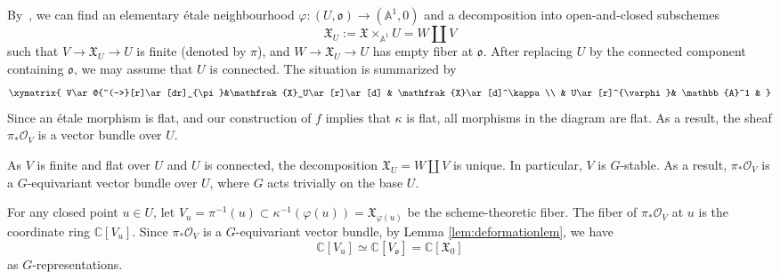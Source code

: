 \documentclass[12pt]{amsart}
\theoremstyle{remark}
\begin{document}
By~\cite[{\href{https://stacks.math.columbia.edu/tag/02LP}{Lemma 37.41.6}}]{Stacks}, we can find an elementary \'etale neighbourhood $\varphi:(U,\mathfrak{o})\to (\mathbb{A}^1,0)$ and a decomposition into open-and-closed subschemes
$$\mathfrak{X}_U:= \mathfrak{X}\times_{\mathbb{A}^1}U 
=W \amalg V$$
such that 
$V\to \mathfrak{X}_U\to U$ is 
finite (denoted by $\pi$), and 
 $W\to \mathfrak{X}_U\to U$ has empty fiber at $\mathfrak{o}$. 
After replacing $U$ by the connected component containing $\mathfrak o$, we may
assume that $U$ is connected. 
The situation is summarized by 
$$\xymatrix{
V\ar@{^(->}[r]\ar[dr]_{\pi}&\mathfrak{X}_U\ar[r]\ar[d] & \mathfrak{X}\ar[d]^\kappa\\
& U\ar[r]^{\varphi}& \mathbb{A}^1
& 
}$$
Since an \'etale morphism is flat, and our construction of $f$ implies that $\kappa$ is flat, all morphisms in the diagram are flat. 
As a result, the sheaf $\pi_*\mathcal{O}_V$ is a vector bundle over $U$.  

As $V$ is finite and flat over $U$ and $U$ is connected, the decomposition $\mathfrak{X}_U=W\amalg V$ is unique. 
In particular, $V$ is $G$-stable. As a result, $\pi_*\mathcal{O}_V$ is a $G$-equivariant vector bundle over $U$, where $G$ acts trivially on the base $U$.

For any closed point $u\in U$, let $V_{u}=\pi^{-1}(u)\subset \kappa^{-1}(\varphi(u))=\mathfrak{X}_{\varphi(u)}$ be the scheme-theoretic fiber. 
The fiber of $\pi_*\mathcal{O}_V$ at $u$ is the coordinate ring
$\mathbb{C}[V_u]$. 
Since $\pi_*\mathcal{O}_V$ is a $G$-equivariant vector bundle, by Lemma \ref{lem:deformationlem}, we have 
\begin{equation}\label{eq:iso1}
\mathbb{C}[V_{u}]\simeq \mathbb{C}[V_{\mathfrak{o}}]=\mathbb{C}[\mathfrak{X}_{0}]
\end{equation}
as $G$-representations.
\end{document}
